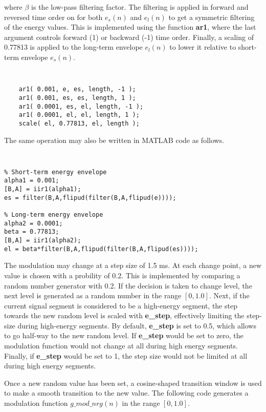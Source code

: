 where $\beta$ is the low-pass filtering factor. The filtering is applied in forward and reversed time order
on for both $e_s(n)$ and $e_l(n)$ to get a symmetric filtering of the energy values. This is implemented using
the function \textbf{ar1}, where the last argument controls forward (1) or backward (-1) time order. Finally,
a scaling of 0.77813 is applied to the long-term envelope $e_l(n)$ to lower it relative to short-term envelope 
$e_s(n)$. 

{\tt\small
\begin{verbatim}
    ar1( 0.001, e, es, length, -1 );
    ar1( 0.001, es, es, length, 1 );
    ar1( 0.0001, es, el, length, -1 );
    ar1( 0.0001, el, el, length, 1 );
    scale( el, 0.77813, el, length );
\end{verbatim}
}

The same operation may also be written in MATLAB code as follows.

{\tt\small
\begin{verbatim}
% Short-term energy envelope
alpha1 = 0.001;
[B,A] = iir1(alpha1);
es = filter(B,A,flipud(filter(B,A,flipud(e))));

% Long-term energy envelope
alpha2 = 0.0001;
beta = 0.77813;
[B,A] = iir1(alpha2);
el = beta*filter(B,A,flipud(filter(B,A,flipud(es))));
\end{verbatim}
}

The modulation may change at a step size of 1.5 ms. At each change point, a new value is chosen
with a probility of 0.2. This is implemented by comparing a random number generator with 0.2. If the decision
is taken to change level, the next level is generated as a random number in the range $[0,1.0]$. Next, if
the current signal segment is considered to be a high-energy segment, the step towards the new random level is
scaled with \textbf{e\_step}, effectively limiting the step-size during high-energy segments. By default, 
\textbf{e\_step} is set to 0.5, which allows to go half-way to the new random level. If \textbf{e\_step} would
be set to zero, the modulation function would not change at all during high energy segments. Finally, if \textbf{e\_step}
would be set to 1, the step size would not be limited at all during high energy segments.

Once a new random value has been set, a cosine-shaped transition window is used to make a smooth transition to the
new value. The following code generates a modulation function $g\_mod\_nrg(n)$ in the range $[0,1.0]$. 


